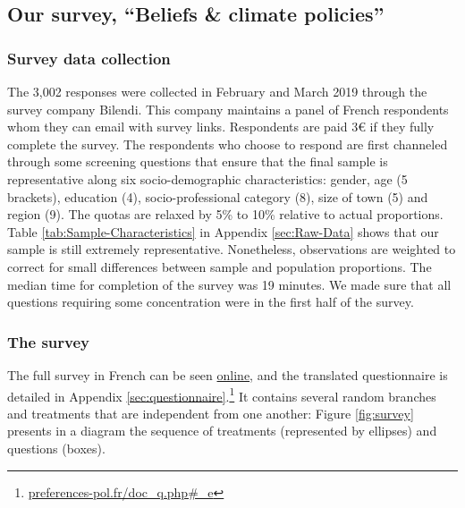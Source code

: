 \documentclass[12pt]{article} %
\begin{document}
\subsection{Our survey, ``Beliefs \& climate policies''\label{subsec:Survey-Beliefs-climate}}


\subsubsection{Survey data collection }

The 3,002 responses were collected in February and March 2019 through the survey company Bilendi. This company maintains a panel of French respondents whom they can email with survey links. Respondents are
paid 3\euro{} if they fully complete the survey. The respondents who choose to respond are first channeled through some screening questions that ensure that the final sample is representative along six socio-demographic characteristics: gender, age (5 brackets), education (4), socio-professional category (8), size of town (5) and region (9). The quotas are relaxed by 5\% to 10\% relative to actual proportions. Table \ref{tab:Sample-Characteristics} in Appendix \ref{sec:Raw-Data} shows that our sample is still extremely representative. Nonetheless, observations are weighted to correct for small differences between sample and population proportions. The median time for completion of the survey was 19 minutes. We made sure that all questions requiring some concentration were in the first half of the survey. %

\subsubsection{The survey \label{subsubsec:the-survey}}

The full survey in French can be seen \href{http://preferences-pol.fr/doc_q.php#_e}{online}, and the translated questionnaire is detailed in Appendix \ref{sec:questionnaire}.\footnote{\href{http:\/\/preferences-pol.fr\/doc\_q.php\#\_e}{preferences-pol.fr/doc\_q.php\#\_e}} It contains several random branches and treatments that are independent from one another: Figure \ref{fig:survey} presents in a diagram the sequence of treatments (represented by ellipses) and questions (boxes).
\end{document}
